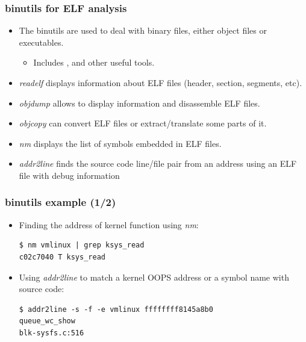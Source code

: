 \begin{frame}
\begin{columns}
  \end{columns}
\end{frame}

\begin{frame}[fragile]
  \frametitle{binutils for ELF analysis}
  \begin{itemize}
    \item The binutils are used to deal with binary files, either object files
          or executables.
    \begin{itemize}
      \item Includes ,  and other useful tools.
    \end{itemize}
    \item {\em readelf} displays information about ELF files (header, section,
          segments, etc).
    \item {\em objdump} allows to display information and disassemble ELF
          files.
    \item {\em objcopy} can convert ELF files or extract/translate some
          parts of it.
    \item {\em nm} displays the list of symbols embedded in ELF files.
    \item {\em addr2line} finds the source code line/file pair from an address using
          an ELF file with debug information
  \end{itemize}
\end{frame}

\begin{frame}[fragile]
  \frametitle{binutils example (1/2)}
  \begin{itemize}
    \item Finding the address of  kernel function using {\em nm}:
    \begin{block}{}
      \begin{verbatim}
$ nm vmlinux | grep ksys_read
c02c7040 T ksys_read
      \end{verbatim}
    \end{block}

    \item Using {\em addr2line} to match a kernel OOPS address or a symbol name
      with source code:
    \begin{block}{}
      \begin{verbatim}
$ addr2line -s -f -e vmlinux ffffffff8145a8b0
queue_wc_show
blk-sysfs.c:516
      \end{verbatim}
    \end{block}
  \end{itemize}
\end{frame}

